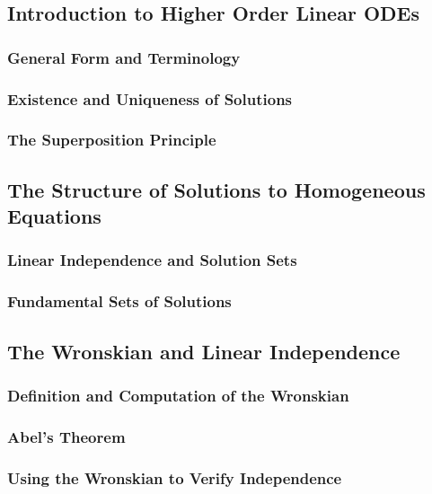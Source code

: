 \documentclass[10pt]{article}
\begin{document}
\subsection{Introduction to Higher Order Linear ODEs}
    \subsubsection{General Form and Terminology}
    \subsubsection{Existence and Uniqueness of Solutions}
    \subsubsection{The Superposition Principle}

\subsection{The Structure of Solutions to Homogeneous Equations}
    \subsubsection{Linear Independence and Solution Sets}
    \subsubsection{Fundamental Sets of Solutions}

\subsection{The Wronskian and Linear Independence}
    \subsubsection{Definition and Computation of the Wronskian}
    \subsubsection{Abel's Theorem}
    \subsubsection{Using the Wronskian to Verify Independence}

\end{document}
